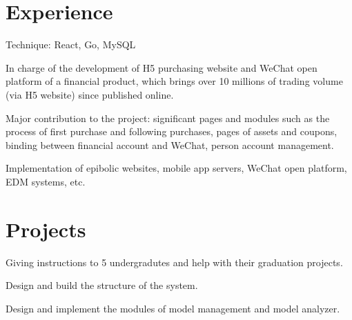 \documentclass[]{resume_en}
\begin{document}
\hfill
\begin{minipage}[t]{0.66\textwidth} 


\section{Experience}
\vspace{\topsep}
\begin{tightemize}
\item Technique: React, Go, MySQL
\item In charge of the development of H5 purchasing website and WeChat open platform of a financial product, which brings over 10 millions of trading volume (via H5 website) since published online.
\item Major contribution to the project: significant pages and modules such as the process of first purchase and following purchases, pages of assets and coupons, binding between financial account and WeChat, person account management.
\end{tightemize}
\shortsectionsep

\begin{tightemize}
\item Implementation of epibolic websites, mobile app servers, WeChat open platform, EDM systems, etc.
\end{tightemize}


\section{Projects}
\begin{tightemize}
\item Giving instructions to 5 undergradutes and help with their graduation projects.
\item Design and build the structure of the system.
\item Design and implement the modules of model management and model analyzer.
\end{tightemize}
\shortsectionsep


\end{minipage}
\end{document}
